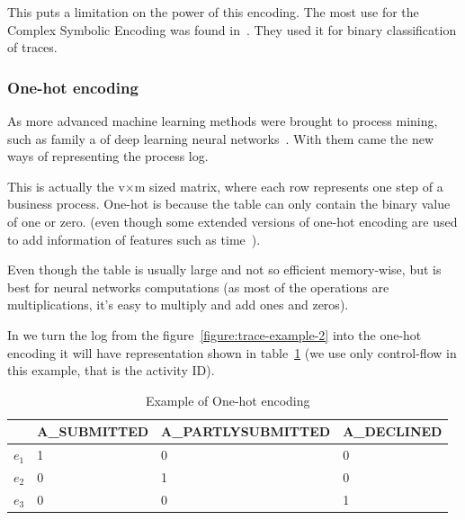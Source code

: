 This puts a limitation on the power of this encoding. The most use for the Complex Symbolic Encoding was found in~\cite{Leontjeva2015,Di-Francescomarino:2016aa,DBLP:conf/bpm/TeinemaaDMF16}. They used it for binary classification of traces. 



\subsubsection{One-hot encoding} \label{one-hot-encoding}

As more advanced machine learning methods were brought to process mining, such as family a of deep learning neural networks~\cite{evermann,niek96732,quteprints96732,evermann2}. With them came the new ways of representing the process log.

This is actually the v×m sized matrix, where each row represents one step of a business process. One-hot is because the table can only contain the binary value of one or zero. (even though some extended versions of one-hot encoding are used to add information of features such as time~\cite{niek96732}). 

Even though the table is usually large and not so efficient memory-wise, but is best for neural networks computations (as most of the operations are multiplications, it's easy to multiply and add ones and zeros). 

In we turn the log from the figure~\ref{figure:trace-example-2} into the one-hot encoding it will have representation shown in table~\ref{tab:one-hot} (we use only control-flow in this example, that is the activity ID).

\begin{table}[h]
	\centering
	\begin{tabular}{| l | l | l | l |}
		\hline
		& A\_SUBMITTED & A\_PARTLYSUBMITTED & A\_DECLINED \\	
		\hline
		$e_{1}$ & 1 & 0 & 0 \\
		$e_{2}$ & 0 & 1 & 0 \\
		$e_{3}$ & 0 & 0 & 1 \\
		\hline
	\end{tabular}
	\caption{Example of One-hot encoding}
	\label{tab:one-hot}
\end{table}



